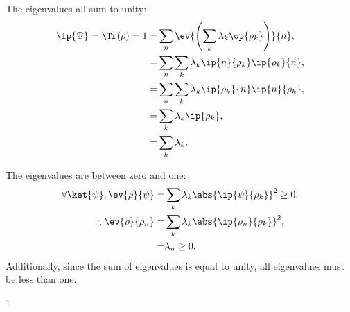 \documentclass[a4paper,12pt,twoside]{article}
\newcommand{\mcols}{0}
\begin{document}
\begin{multicols*}{2}
\subsubsection{}
The eigenvalues all sum to unity:
\begin{align}
	\ip{\Psi} = \Tr(\rho) = 1 =& \sum_n \ev{\left(\sum_k \lambda_k \op{\rho_k}\right)}{n},\\
	=& \sum_n \sum_k \lambda_k \ip{n}{\rho_k}\ip{\rho_k}{n},\\
	=& \sum_n \sum_k \lambda_k \ip{\rho_k}{n}\ip{n}{\rho_k},\\
	=& \sum_k \lambda_k \ip{\rho_k},\\
	=& \sum_k \lambda_k.
\end{align}

The eigenvalues are between zero and one:
\begin{align}
	\forall \ket{\psi}, \ev{\rho}{\psi} =& \sum_{k} \lambda_k \abs{\ip{\psi}{\rho_k}}^2 \geq 0.\\
	\therefore \ev{\rho}{\rho_n} =& \sum_k \lambda_k \abs{\ip{\rho_n}{\rho_k}}^2,\\
	=& \lambda_n \geq 0.
\end{align}
Additionally, since the sum of eigenvalues is equal to unity, all eigenvalues must be less than one.

\printBib


\if\mcols1
\end{multicols*}
\fi
\end{document}

